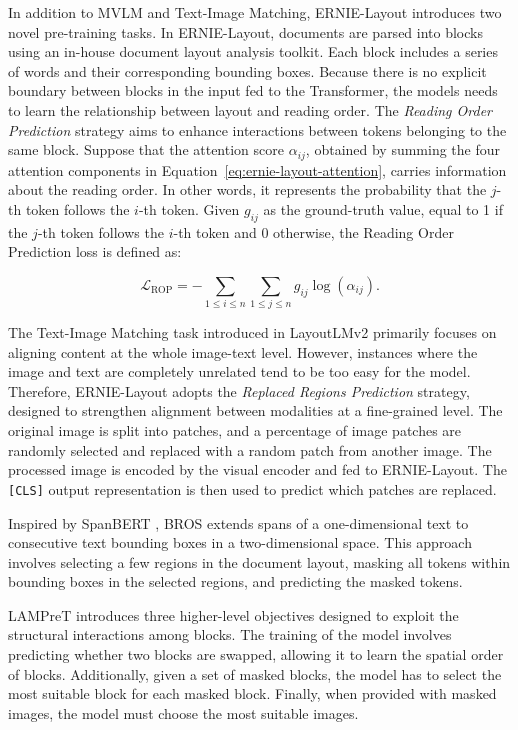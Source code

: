 In addition to \ac{MVLM} and Text-Image Matching, ERNIE-Layout  \citep{peng2022ernie} introduces two novel pre-training tasks. In ERNIE-Layout, documents are parsed into blocks using an in-house document layout analysis toolkit. Each block includes a series of words and their corresponding bounding boxes. Because there is no explicit boundary between blocks in the input fed to the Transformer, the models needs to learn the relationship between layout and reading order. The \textit{Reading Order Prediction} strategy aims to enhance interactions between tokens belonging to the same block. Suppose that the attention score $\alpha_{ij}$, obtained by summing the four attention components in Equation~\ref{eq:ernie-layout-attention}, carries information about the reading order. In other words, it represents the probability that the $j$-th token follows the $i$-th token. Given $g_{ij}$ as the ground-truth value, equal to 1 if the $j$-th token follows the $i$-th token and $0$ otherwise, the Reading Order Prediction loss is defined as:

\begin{equation}
    \mathcal{L}_{\text{ROP}} = - \sum_{1 \leq i \leq n}\sum_{1 \leq j \leq n} g_{ij} \log(\alpha_{ij}).
\end{equation}

\noindent The Text-Image Matching task introduced in LayoutLMv2 primarily focuses on aligning content at the whole image-text level. However, instances where the image and text are completely unrelated tend to be too easy for the model. Therefore, ERNIE-Layout adopts the \textit{Replaced Regions Prediction} strategy, designed to strengthen alignment between modalities at a fine-grained level. The original image is split into patches, and a percentage of image patches are randomly selected and replaced with a random patch from another image. The processed image is encoded by the visual encoder and fed to ERNIE-Layout. The \texttt{[CLS]} output representation is then used to predict which patches are replaced. 

Inspired by SpanBERT \citep{joshi2020spanbert}, BROS \citep{hong2020bros} extends spans of a one-dimensional text to consecutive text bounding boxes in a two-dimensional space. This approach involves selecting a few regions in the document layout, masking all tokens within bounding boxes in the selected regions, and predicting the masked tokens. 

\ac{LAMPreT} \citep{wu2021lampret} introduces three higher-level objectives designed to exploit the structural interactions among blocks. The training of the model involves predicting whether two blocks are swapped, allowing it to learn the spatial order of blocks. Additionally, given a set of masked blocks, the model has to select the most suitable block for each masked block. Finally, when provided with masked images, the model must choose the most suitable images.

